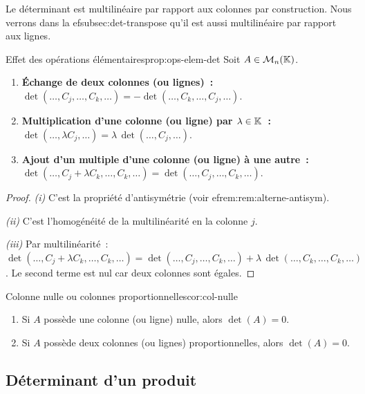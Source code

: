 Le déterminant est multilinéaire par rapport aux colonnes par
construction. Nous verrons dans la 
ef{subsec:det-transpose} qu'il
est aussi multilinéaire par rapport aux lignes.

\begin{proposition}{Effet des opérations élémentaires}{prop:ops-elem-det}
  Soit $A\in\mathcal{M}_n({\mathbb{K}})$.
  \begin{enumerate}[label=(\roman*)]
    \item \textbf{Échange de deux colonnes (ou lignes)~:}
      $\det(\ldots,C_j,\ldots,C_k,\ldots)
      =-\det(\ldots,C_k,\ldots,C_j,\ldots)$.
    \item \textbf{Multiplication d'une colonne (ou ligne) par $\lambda\in{\mathbb{K}}$~:}
      $\det(\ldots,\lambda C_j,\ldots)=\lambda\,\det(\ldots,C_j,\ldots)$.
    \item \textbf{Ajout d'un multiple d'une colonne (ou ligne) à une autre~:}
      $\det(\ldots,C_j+\lambda C_k,\ldots,C_k,\ldots)
      =\det(\ldots,C_j,\ldots,C_k,\ldots)$.
  \end{enumerate}
\end{proposition}

\begin{proof}
  \emph{(i)} C'est la propriété d'antisymétrie (voir 
ef{rem:rem:alterne-antisym}).

  \emph{(ii)} C'est l'homogénéité de la multilinéarité en la colonne $j$.

  \emph{(iii)} Par multilinéarité~:
  $\det(\ldots,C_j+\lambda C_k,\ldots,C_k,\ldots)
  =\det(\ldots,C_j,\ldots,C_k,\ldots)
  +\lambda\,\det(\ldots,C_k,\ldots,C_k,\ldots)$.
  Le second terme est nul car deux colonnes sont égales.
\end{proof}

\begin{corollary}{Colonne nulle ou colonnes proportionnelles}{cor:col-nulle}
  \begin{enumerate}[label=(\roman*)]
    \item Si $A$ possède une colonne (ou ligne) nulle, alors $\det(A)=0$.
    \item Si $A$ possède deux colonnes (ou lignes) proportionnelles,
      alors $\det(A)=0$.
  \end{enumerate}
\end{corollary}

\subsection{Déterminant d'un produit}\label{subsec:det-produit}

